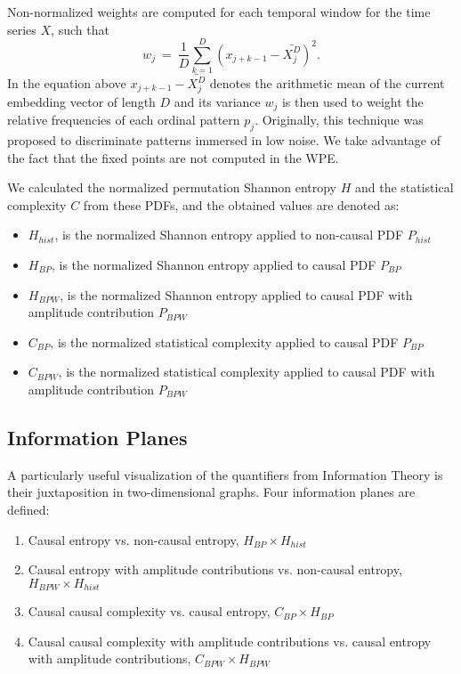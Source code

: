 Non-normalized weights are computed for each temporal window for the time series $X$, such that
\begin{equation}
\label{WPE_weigth}
w_j~=~\frac{1}{D}\sum_{k=1}^{D} \left(x_{j+k-1}-\bar{X_j^D}\right)^2.
\end{equation}
In the equation above $x_{j+k-1}-\bar{X_j^D}$ denotes the arithmetic mean of the current embedding vector of length $D$ and its variance $w_j$ is then used to weight the relative frequencies of each ordinal pattern $p_j$.
Originally, this technique was proposed to discriminate patterns immersed in low noise.
We take advantage of the fact that the fixed points are not computed in the WPE.

We calculated the normalized permutation Shannon entropy $H$ and the statistical complexity $C$ from these PDFs, and the obtained values are denoted as:
\begin{itemize}
	\item $H_{hist}$, is the normalized Shannon entropy applied to non-causal PDF $P_{hist}$
	\item $H_{BP}$, is the normalized Shannon entropy applied to causal PDF $P_{BP}$
	\item $H_{BPW}$, is the normalized Shannon entropy applied to causal PDF with amplitude contribution $P_{BPW}$
	\item $C_{BP}$, is the normalized statistical complexity applied to causal PDF $P_{BP}$
	\item $C_{BPW}$, is the normalized statistical complexity applied to causal PDF with amplitude contribution $P_{BPW} $
\end{itemize}

\subsection{Information Planes}

A particularly useful visualization of the quantifiers from Information Theory is their juxtaposition in two-dimensional graphs.
Four information planes are defined:
\begin{enumerate}
	\item Causal entropy vs. non-causal entropy, $H_{BP} \times H_{hist}$
	\item Causal entropy with amplitude contributions vs. non-causal entropy, $H_{BPW} \times H_{hist}$
	\item Causal causal complexity vs. causal entropy, $C_{BP} \times H_{BP}$
	\item Causal causal complexity with amplitude contributions vs. causal entropy with amplitude contributions, $C_{BPW} \times H_{BPW}$
\end{enumerate}

